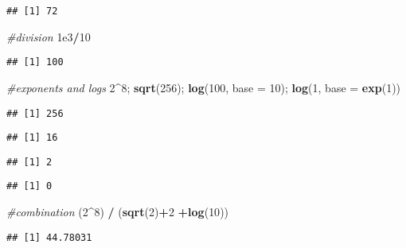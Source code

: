 \documentclass[
]{article}
\newenvironment{Shaded}{\begin{snugshade}}{\end{snugshade}}
\newcommand{\AttributeTok}[1]{\textcolor[rgb]{0.13,0.29,0.53}{#1}}
\newcommand{\CommentTok}[1]{\textcolor[rgb]{0.56,0.35,0.01}{\textit{#1}}}
\newcommand{\DecValTok}[1]{\textcolor[rgb]{0.00,0.00,0.81}{#1}}
\newcommand{\FloatTok}[1]{\textcolor[rgb]{0.00,0.00,0.81}{#1}}
\newcommand{\FunctionTok}[1]{\textcolor[rgb]{0.13,0.29,0.53}{\textbf{#1}}}
\newcommand{\NormalTok}[1]{#1}
\newcommand{\SpecialCharTok}[1]{\textcolor[rgb]{0.81,0.36,0.00}{\textbf{#1}}}
\begin{document}
\begin{verbatim}
## [1] 72
\end{verbatim}

\begin{Shaded}
\begin{Highlighting}[]
\CommentTok{\#division}
\FloatTok{1e3}\SpecialCharTok{/}\DecValTok{10}
\end{Highlighting}
\end{Shaded}

\begin{verbatim}
## [1] 100
\end{verbatim}

\begin{Shaded}
\begin{Highlighting}[]
\CommentTok{\#exponents and logs}
\DecValTok{2}\SpecialCharTok{\^{}}\DecValTok{8}\NormalTok{; }\FunctionTok{sqrt}\NormalTok{(}\DecValTok{256}\NormalTok{); }\FunctionTok{log}\NormalTok{(}\DecValTok{100}\NormalTok{, }\AttributeTok{base =} \DecValTok{10}\NormalTok{); }\FunctionTok{log}\NormalTok{(}\DecValTok{1}\NormalTok{, }\AttributeTok{base =} \FunctionTok{exp}\NormalTok{(}\DecValTok{1}\NormalTok{))}
\end{Highlighting}
\end{Shaded}

\begin{verbatim}
## [1] 256
\end{verbatim}

\begin{verbatim}
## [1] 16
\end{verbatim}

\begin{verbatim}
## [1] 2
\end{verbatim}

\begin{verbatim}
## [1] 0
\end{verbatim}

\begin{Shaded}
\begin{Highlighting}[]
\CommentTok{\#combination}
\NormalTok{(}\DecValTok{2}\SpecialCharTok{\^{}}\DecValTok{8}\NormalTok{) }\SpecialCharTok{/}\NormalTok{ (}\FunctionTok{sqrt}\NormalTok{(}\DecValTok{2}\NormalTok{)}\SpecialCharTok{+}\DecValTok{2} \SpecialCharTok{+}\FunctionTok{log}\NormalTok{(}\DecValTok{10}\NormalTok{))}
\end{Highlighting}
\end{Shaded}

\begin{verbatim}
## [1] 44.78031
\end{verbatim}
\end{document}
